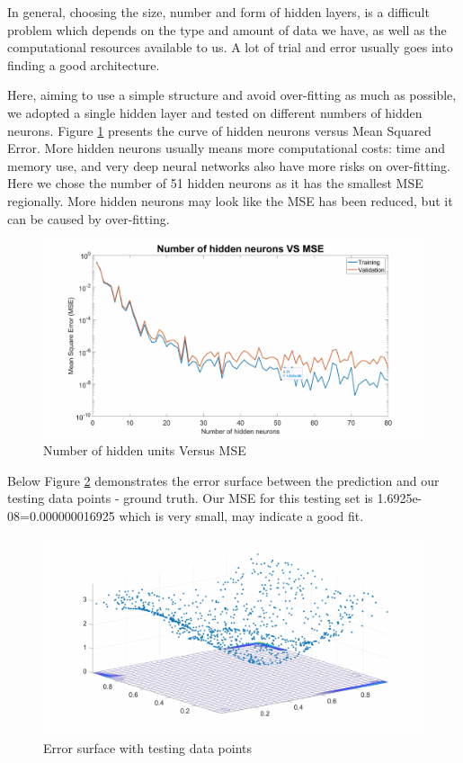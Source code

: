 \documentclass{article}
\begin{document}
In general, choosing the size, number and form of hidden layers, is a difficult problem which depends on the type and amount of data we have, as well as the computational resources available to us. A lot of trial and error usually goes into finding a good architecture.

Here, aiming to use a simple structure and avoid over-fitting as much as possible, we adopted a single hidden layer and tested on different numbers of hidden neurons. Figure \ref{fig:hidden} presents the curve of hidden neurons versus Mean Squared Error. More hidden neurons usually means more computational costs: time and memory use, and very deep neural networks also have more risks on over-fitting. Here we chose the number of 51 hidden neurons as it has the smallest MSE regionally. More hidden neurons may look like the MSE has been reduced, but it can be caused by over-fitting.

\begin{figure}[h!]
  \centering
  \includegraphics[width=\textwidth]{lab1/hiddenneuron.pdf}
  \caption{Number of hidden units Versus MSE}
  \label{fig:hidden}
\end{figure}

Below Figure \ref{fig:error} demonstrates the error surface between the prediction and our testing data points - ground truth. Our MSE for this testing set is 1.6925e-08=0.000000016925 which is very small, may indicate a good fit.

\begin{figure}[h!]
  \centering
  \includegraphics[width=\textwidth]{lab1/errorsurface.pdf}
  \caption{Error surface with testing data points}
  \label{fig:error}
\end{figure}
\end{document}
